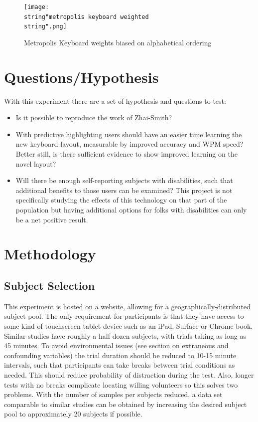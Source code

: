 \documentclass[english]{vgtc}
\begin{document}
\begin{figure}[!htb]
  \centering
  \texttt{[image: \\string"metropolis keyboard weighted\\string".png]}
  \caption{Metropolis Keyboard weights biased on alphabetical ordering \cite{Zhai01}}
  \label{fig:metropolis_weighted}
\end{figure}

\section{Questions/Hypothesis}

With this experiment there are a set of hypothesis and questions to test:

\begin{itemize}
\item Is it possible to reproduce the work of Zhai-Smith?
\item With predictive highlighting users should have an easier time learning 
the new keyboard layout, measurable by improved accuracy and WPM speed?  Better still,
is there sufficient evidence to show improved learning on the novel layout?
\item Will there be enough self-reporting subjects with disabilities,
such that additional benefits to those users can be examined?  This project is not 
specifically studying the effects of this technology on that part of the population 
but having additional options for folks with disabilities can only be a net positive result.
\end{itemize}

\section{Methodology}

\subsection{Subject Selection}

This experiment is hosted on a website, allowing for a geographically-distributed subject pool. The only requirement for participants is that they have access to some kind of touchscreen tablet device such as an iPad, Surface or Chrome book. Similar studies have roughly a half dozen subjects, with trials taking as long  as 45 minutes. To avoid environmental issues (see section on extraneous and  confounding variables) the trial duration should be reduced to 10-15 minute intervals, such that participants can take breaks between trial conditions as needed.  This should reduce probability of distraction during the test. Also, longer tests with no breaks complicate locating willing volunteers so this solves two problems.
With the number of samples per subjects reduced, a data set comparable
to similar studies can be obtained by increasing the desired subject
pool to approximately 20 subjects if possible.
\end{document}
